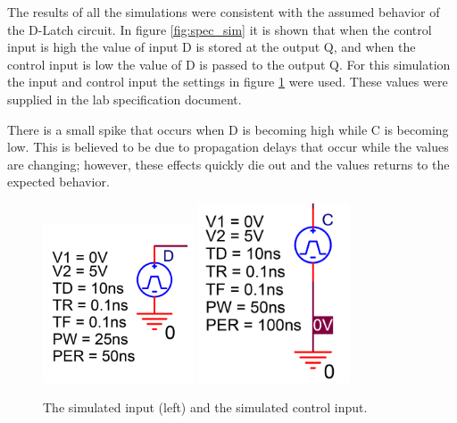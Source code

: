 The results of all the simulations were consistent with the assumed behavior of the D-Latch circuit. In figure \ref{fig:spec_sim} it is shown that when the control input is high the value of input D is stored at the output Q, and when the control input is low the value of D is passed to the output Q. For this simulation the input and control input the settings in figure \ref{fig:supplys} were used. These values were supplied in the lab specification document.

There is a small spike that occurs when D is becoming high while C is becoming low. This is believed to be due to propagation delays that occur while the values are changing; however, these effects quickly die out and the values returns to the expected behavior.

\FloatBarrier

\begin{figure}[h!]
	\centering
	\includegraphics[width=0.4\textwidth]{../images/D_supply}
	\includegraphics[width=0.4\textwidth]{../images/C_supply}
	\caption{The simulated input (left) and the simulated control input.}
	\label{fig:supplys}
\end{figure}

\FloatBarrier

\FloatBarrier

